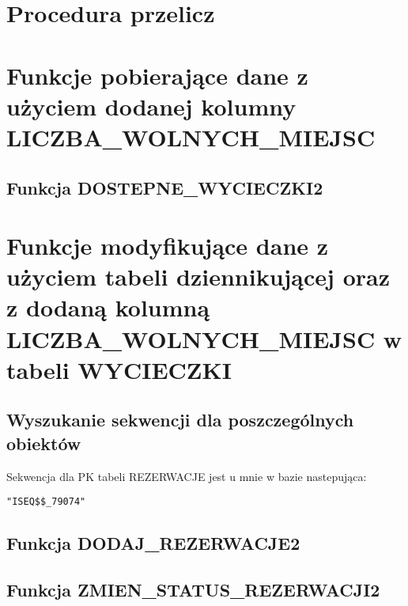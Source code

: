 \documentclass[a4paper, 11pt]{article}
\begin{document}
    \section{Procedura przelicz}
    

    \newpage

    \section{Funkcje pobierające dane z użyciem dodanej kolumny
    \newline LICZBA\_WOLNYCH\_MIEJSC}

    \subsection{Funkcja DOSTEPNE\_WYCIECZKI2}
    

    \newpage


    \section{Funkcje modyfikujące dane z użyciem tabeli dziennikującej oraz z dodaną kolumną LICZBA\_WOLNYCH\_MIEJSC w tabeli WYCIECZKI}

    \subsection{Wyszukanie sekwencji dla poszczególnych obiektów}
    

    Sekwencja dla PK tabeli REZERWACJE jest u mnie w bazie nastepująca:

    \begin{lstlisting}[language={}, caption={}]
        "ISEQ$$_79074"
    \end{lstlisting}


    \subsection{Funkcja DODAJ\_REZERWACJE2}
    

    \newpage

    \subsection{Funkcja ZMIEN\_STATUS\_REZERWACJI2}
    
\end{document}
